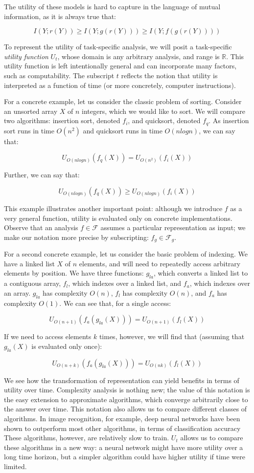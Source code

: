 \documentclass[12pt]{book}
\begin{document}
The utility of these models is hard to capture in the language of mutual information, as it is always true that:

\[
I(Y; r(Y)) \geq I(Y; g(r(Y))) \geq I(Y; f(g(r(Y))))
\]

To represent the utility of task-specific analysis, we will posit a task-specific \textit{utility function} $U_t$, whose domain is any arbitrary analysis, and range is $\mathbb{R}$.
This utility function is left intentionally general and can incorporate many factors, such as computability.
The subscript $t$ reflects the notion that utility is interpreted as a function of time (or more concretely, computer instructions).

For a concrete example, let us consider the classic problem of sorting.
Consider an unsorted array $X$ of $n$ integers, which we would like to sort.
We will compare two algorithms: insertion sort, denoted $f_i$, and quicksort, denoted $f_q$.
As insertion sort runs in time $O(n^2)$ and quicksort runs in time $O(nlogn)$, we can say that:

\[
U_{O(nlogn)}(f_q(X)) = U_{O(n^2)}(f_i(X))
\]

Further, we can say that:

\[
U_{O(nlogn)}(f_q(X)) \geq U_{O(nlogn)}(f_i(X))
\]

This example illustrates another important point: although we introduce $f$ as a very general function, utility is evaluated only on concrete implementations.
Observe that an analysis $f \in \mathcal{F}$ assumes a particular representation as input; we make our notation more precise by subscripting: $f_g \in \mathcal{F}_g$.

For a second concrete example, let us consider the basic problem of indexing.
We have a linked list $X$ of $n$ elements, and will need to repeatedly access arbitrary elements by position.
We have three functions: $g_{la}$, which converts a linked list to a contiguous array, $f_l$, which indexes over a linked list, and $f_a$, which indexes over an array. $g_{la}$ has complexity $O(n)$, $f_l$ has complexity $O(n)$, and $f_a$ has complexity $O(1)$.
We can see that, for a single access:

\[
U_{O(n+1)}(f_a(g_{la}(X))) = U_{O(n+1)}(f_l(X))
\]

If we need to access elements $k$ times, however, we will find that (assuming that $g_{la}(X)$ is evaluated only once):

\[
U_{O(n+k)}(f_a(g_{la}(X))) = U_{O(nk)}(f_l(X))
\]

We see how the transformation of representation can yield benefits in terms of utility over time.
Complexity analysis is nothing new; the value of this notation is the easy extension to approximate algorithms, which converge arbitrarily close to the  answer over time.
This notation also allows us to compare different classes of algorithms.
In image recognition, for example, deep neural networks have been shown to outperform most other algorithms, in terms of classification accuracy
These algorithms, however, are relatively slow to train.
$U_t$ allows us to compare these algorithms in a new way: a neural network might have more utility over a long time horizon, but a simpler algorithm could have higher utility if time were limited.
\end{document}
